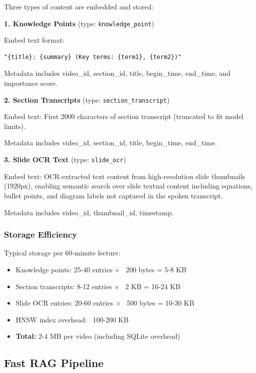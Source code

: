 Three types of content are embedded and stored:

\textbf{1. Knowledge Points} (type: \texttt{knowledge\_point})

Embed text format:
\begin{verbatim}
"{title}: {summary} (Key terms: {term1}, {term2})"
\end{verbatim}

Metadata includes video\_id, section\_id, title, begin\_time, end\_time, and importance score.

\textbf{2. Section Transcripts} (type: \texttt{section\_transcript})

Embed text: First 2000 characters of section transcript (truncated to fit model limits).

Metadata includes video\_id, section\_id, title, begin\_time, end\_time.

\textbf{3. Slide OCR Text} (type: \texttt{slide\_ocr})

Embed text: OCR-extracted text content from high-resolution slide thumbnails (1920px), enabling semantic search over slide textual content including equations, bullet points, and diagram labels not captured in the spoken transcript.

Metadata includes video\_id, thumbnail\_id, timestamp.

\subsubsection{Storage Efficiency}

Typical storage per 60-minute lecture:

\begin{itemize}
    \item Knowledge points: 25-40 entries $\times$ ~200 bytes = 5-8 KB
    \item Section transcripts: 8-12 entries $\times$ ~2 KB = 16-24 KB
    \item Slide OCR entries: 20-60 entries $\times$ ~500 bytes = 10-30 KB
    \item HNSW index overhead: ~100-200 KB
    \item \textbf{Total:} 2-4 MB per video (including SQLite overhead)
\end{itemize}

\subsection{Fast RAG Pipeline}

